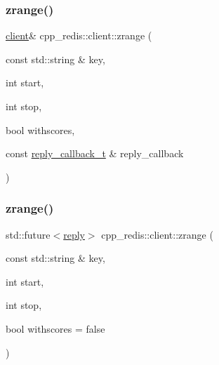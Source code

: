 \subsubsection{\texorpdfstring{zrange()}{zrange()}\hspace{0.1cm}{\footnotesize\ttfamily [2/9]}}
{\footnotesize\ttfamily \hyperlink{classcpp__redis_1_1client}{client}\& cpp\+\_\+redis\+::client\+::zrange (\begin{DoxyParamCaption}\item[{const std\+::string \&}]{key,  }\item[{int}]{start,  }\item[{int}]{stop,  }\item[{bool}]{withscores,  }\item[{const \hyperlink{classcpp__redis_1_1client_a061a1140d36d2eaeda82b09a0bb3f9f2}{reply\+\_\+callback\+\_\+t} \&}]{reply\+\_\+callback }\end{DoxyParamCaption})}

\mbox{\label{classcpp__redis_1_1client_a75f0e330b851c7bfcf373a7ef9f30cb8}} 
\subsubsection{\texorpdfstring{zrange()}{zrange()}\hspace{0.1cm}{\footnotesize\ttfamily [3/9]}}
{\footnotesize\ttfamily std\+::future$<$\hyperlink{classcpp__redis_1_1reply}{reply}$>$ cpp\+\_\+redis\+::client\+::zrange (\begin{DoxyParamCaption}\item[{const std\+::string \&}]{key,  }\item[{int}]{start,  }\item[{int}]{stop,  }\item[{bool}]{withscores = {\ttfamily false} }\end{DoxyParamCaption})}

\mbox{\label{classcpp__redis_1_1client_a24f15cede24bdb482167b1ea00db3160}} 
